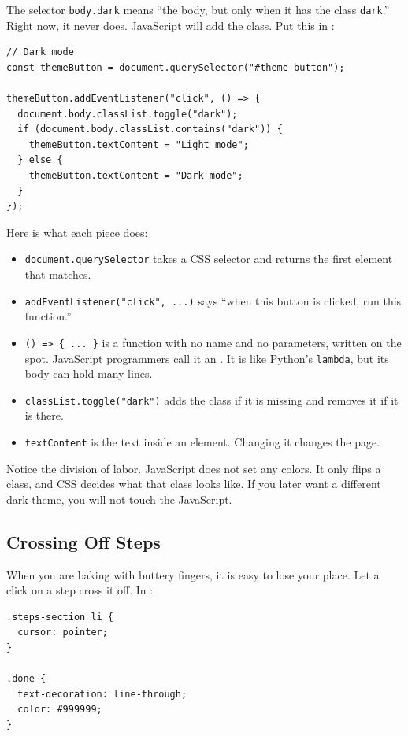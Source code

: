 The selector \verb|body.dark| means ``the body, but only when it has the class \verb|dark|.'' Right now,
it never does. JavaScript will add the class. Put this in :

\begin{verbatim}
// Dark mode
const themeButton = document.querySelector("#theme-button");

themeButton.addEventListener("click", () => {
  document.body.classList.toggle("dark");
  if (document.body.classList.contains("dark")) {
    themeButton.textContent = "Light mode";
  } else {
    themeButton.textContent = "Dark mode";
  }
});
\end{verbatim}

Here is what each piece does:
\begin{itemize}
\item \verb|document.querySelector| takes a CSS selector and returns the first element that matches.
\item \verb|addEventListener("click", ...)| says ``when this button is clicked, run this function.''
\item \verb|() => { ... }| is a function with no name and no parameters, written on the spot. JavaScript
programmers call it an . It is like Python's \verb|lambda|, but its body can hold
many lines.
\item \verb|classList.toggle("dark")| adds the class if it is missing and removes it if it is there.
\item \verb|textContent| is the text inside an element. Changing it changes the page.
\end{itemize}

Notice the division of labor. JavaScript does not set any colors. It only flips a class, and CSS decides
what that class looks like. If you later want a different dark theme, you will not touch the JavaScript.

\subsection{Crossing Off Steps}
When you are baking with buttery fingers, it is easy to lose your place. Let a click on a step cross it
off. In :

\begin{verbatim}
.steps-section li {
  cursor: pointer;
}

.done {
  text-decoration: line-through;
  color: #999999;
}
\end{verbatim}

